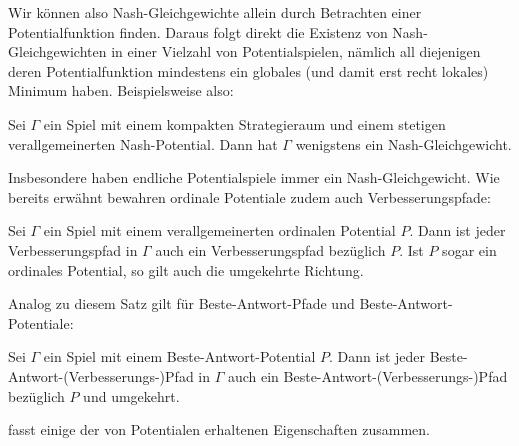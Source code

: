 Wir können also Nash-Gleichgewichte allein durch Betrachten einer Potentialfunktion finden. Daraus folgt direkt die Existenz von Nash-Gleichgewichten in einer Vielzahl von Potentialspielen, nämlich all diejenigen deren Potentialfunktion mindestens ein globales (und damit erst recht lokales) Minimum haben. Beispielsweise also:

\begin{kor}
	Sei $\Gamma$ ein Spiel mit einem kompakten Strategieraum und einem stetigen verallgemeinerten Nash-Potential. Dann hat $\Gamma$ wenigstens ein Nash-Gleichgewicht.
\end{kor}

Insbesondere haben endliche Potentialspiele immer ein Nash-Gleichgewicht. Wie bereits erwähnt bewahren ordinale Potentiale zudem auch Verbesserungspfade:

\begin{satz}\label{prop:ordPotVerbpfad}
	Sei $\Gamma$ ein Spiel mit einem verallgemeinerten ordinalen Potential $P$. Dann ist jeder Verbesserungspfad in $\Gamma$ auch ein Verbesserungspfad bezüglich $P$. Ist $P$ sogar ein ordinales Potential, so gilt auch die umgekehrte Richtung.
\end{satz}

Analog zu diesem Satz gilt für Beste-Antwort-Pfade und Beste-Antwort-Potentiale:

\begin{satz}\label{prop:BAPotBAPfad}
	Sei $\Gamma$ ein Spiel mit einem Beste-Antwort-Potential $P$. Dann ist jeder Beste-Antwort-(Verbesserungs-)Pfad in $\Gamma$ auch ein Beste-Antwort-(Verbesserungs-)Pfad bezüglich $P$ und umgekehrt.
\end{satz}

 fasst einige der von Potentialen erhaltenen Eigenschaften zusammen.

